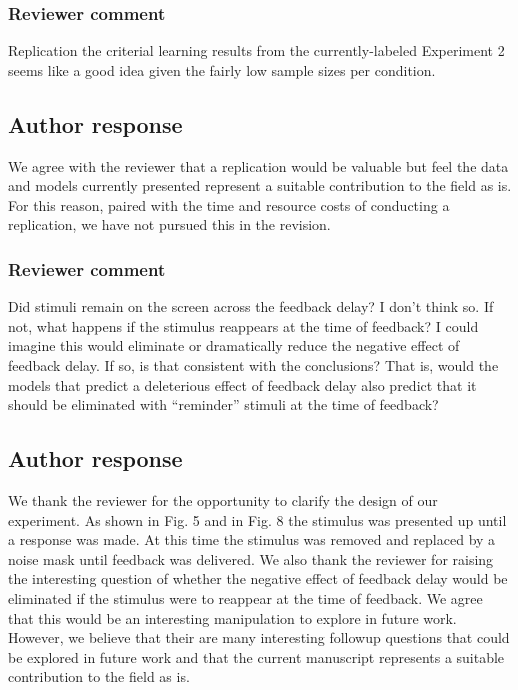 \documentclass[12pt]{article}
\begin{document}
\subsubsection{Reviewer comment}
Replication the criterial learning results from the
currently-labeled Experiment 2 seems like a good idea given
the fairly low sample sizes per condition.

\subsection{Author response}
We agree with the reviewer that a replication would be
valuable but feel the data and models currently presented
represent a suitable contribution to the field as is. For
this reason, paired with the time and resource costs of
conducting a replication, we have not pursued this in the
revision.

\subsubsection{Reviewer comment}
Did stimuli remain on the screen across the feedback delay?
I don’t think so. If not, what happens if the stimulus
reappears at the time of feedback? I could imagine this
would eliminate or dramatically reduce the negative effect
of feedback delay. If so, is that consistent with the
conclusions? That is, would the models that predict a
deleterious effect of feedback delay also predict that it
should be eliminated with ``reminder'' stimuli at the time of
feedback?

\subsection{Author response}
We thank the reviewer for the opportunity to clarify the
design of our experiment. As shown in Fig. 5 and in Fig. 8
the stimulus was presented up until a response was made. At
this time the stimulus was removed and replaced by a noise
mask until feedback was delivered. We also thank the
reviewer for raising the interesting question of whether the
negative effect of feedback delay would be eliminated if the
stimulus were to reappear at the time of feedback. We agree
that this would be an interesting manipulation to explore in
future work. However, we believe that their are many
interesting followup questions that could be explored in
future work and that the current manuscript represents a
suitable contribution to the field as is.
\end{document}
